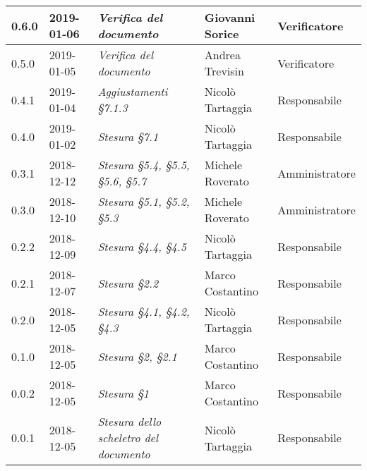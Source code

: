 \begin{longtable}{C{2cm}|C{2.5cm}|C{4.5cm}|C{2.5cm}|C{3cm}}
		0.6.0 & 2019-01-06 & \emph{Verifica del documento} & Giovanni Sorice & Verificatore \\
		\hline

		0.5.0 & 2019-01-05 & \emph{Verifica del documento} & Andrea Trevisin & Verificatore \\
		\hline

		0.4.1 & 2019-01-04 & \emph{Aggiustamenti §7.1.3} & Nicolò Tartaggia & Responsabile \\
		\hline

		0.4.0 & 2019-01-02 & \emph{Stesura §7.1} & Nicolò Tartaggia & Responsabile \\
		\hline

		0.3.1 & 2018-12-12 & \emph{Stesura §5.4, §5.5, §5.6, §5.7} & Michele Roverato & Amministratore \\
		\hline

		0.3.0 & 2018-12-10 & \emph{Stesura §5.1, §5.2, §5.3} & Michele Roverato & Amministratore \\
		\hline

		0.2.2 & 2018-12-09 & \emph{Stesura §4.4, §4.5} & Nicolò Tartaggia & Responsabile \\
		\hline

		0.2.1 & 2018-12-07 & \emph{Stesura §2.2} & Marco Costantino & Responsabile \\
		\hline

		0.2.0 & 2018-12-05 & \emph{Stesura §4.1, §4.2, §4.3} & Nicolò Tartaggia & Responsabile \\
		\hline

		0.1.0 & 2018-12-05 & \emph{\textit{Stesura §2, §2.1}} & Marco Costantino & Responsabile \\
		\hline

		0.0.2 & 2018-12-05 & \emph{Stesura §1} & Marco Costantino & Responsabile \\
		\hline

		0.0.1 & 2018-12-05 & \emph{Stesura dello scheletro del documento} & Nicolò Tartaggia & Responsabile \\

	\end{longtable}

\clearpage
